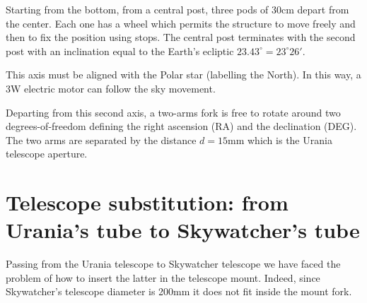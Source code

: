 \documentclass{article}
\begin{document}
\begin{multicols}{2}
        Starting from the bottom, from a central post, three pods of 30cm depart from the center. Each one has a wheel which permits the structure to move freely and then to fix the position using stops.
        The central post terminates with the second post with an inclination equal to the Earth's ecliptic \(23.43^{\circ} = 23^{\circ} 26'\).

        This axis must be aligned with the Polar star (labelling the North).
        In this way, a 3W electric motor can follow the sky movement.

        Departing from this second axis, a two-arms fork is free to rotate around two degrees-of-freedom defining the right ascension (RA) and the declination (DEG).
        The two arms are separated by the distance \(d = 15\)mm which is the Urania telescope aperture.

        \section{Telescope substitution: from Urania's tube to Skywatcher's tube}
        Passing from the Urania telescope to Skywatcher telescope we have faced the problem of how to insert the latter in the telescope mount.
        Indeed, since Skywatcher's telescope diameter is 200mm it does not fit inside the mount fork.


\end{multicols}
\end{document}
